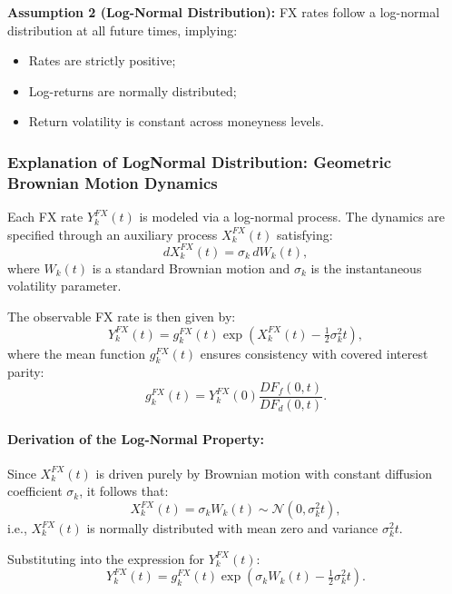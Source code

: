 \textbf{Assumption 2 (Log-Normal Distribution):} FX rates follow a log-normal distribution at all future times, implying:
\begin{itemize}
	\item Rates are strictly positive;
	\item Log-returns are normally distributed;
	\item Return volatility is constant across moneyness levels.
\end{itemize}


\newpage
\subsubsection{Explanation of LogNormal Distribution: Geometric Brownian Motion Dynamics}

Each FX rate $Y_k^{FX}(t)$ is modeled via a log-normal process. The dynamics are specified through an auxiliary process $X_k^{FX}(t)$ satisfying:
\begin{equation}
	dX_k^{FX}(t) = \sigma_k\,dW_k(t),
\end{equation}
where $W_k(t)$ is a standard Brownian motion and $\sigma_k$ is the instantaneous volatility parameter.

The observable FX rate is then given by:
\begin{equation}
	Y_k^{FX}(t) = g_k^{FX}(t)\exp\!\left(X_k^{FX}(t) - \tfrac{1}{2}\sigma_k^2 t\right),
\end{equation}
where the mean function $g_k^{FX}(t)$ ensures consistency with covered interest parity:
\begin{equation}
	g_k^{FX}(t) = Y_k^{FX}(0)\frac{DF_f(0,t)}{DF_d(0,t)}.
\end{equation}

\paragraph{Derivation of the Log-Normal Property:}

Since $X_k^{FX}(t)$ is driven purely by Brownian motion with constant diffusion coefficient $\sigma_k$, it follows that:
\begin{equation}
	X_k^{FX}(t) = \sigma_k W_k(t) \sim \mathcal{N}(0, \sigma_k^2 t),
\end{equation}
i.e., $X_k^{FX}(t)$ is normally distributed with mean zero and variance $\sigma_k^2 t$.

Substituting into the expression for $Y_k^{FX}(t)$:
\begin{equation}
	Y_k^{FX}(t) = g_k^{FX}(t) \exp\!\left(\sigma_k W_k(t) - \tfrac{1}{2}\sigma_k^2 t\right).
\end{equation}

